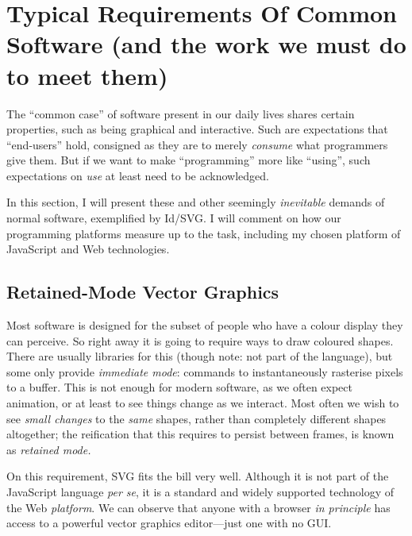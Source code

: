 \hypertarget{typical-requirements-of-common-software-and-the-work-we-must-do-to-meet-them}{%
\section{Typical Requirements Of Common Software (and the work we must
do to meet
them)}\label{typical-requirements-of-common-software-and-the-work-we-must-do-to-meet-them}}

The ``common case'' of software present in our daily lives shares
certain properties, such as being graphical and interactive. Such are
expectations that ``end-users'' hold, consigned as they are to merely
\emph{consume} what programmers give them. But if we want to make
``programming'' more like ``using'', such expectations on \emph{use} at
least need to be acknowledged.

In this section, I will present these and other seemingly
\emph{inevitable} demands of normal software, exemplified by Id{}/SVG. I
will comment on how our programming platforms measure up to the task,
including my chosen platform of JavaScript and Web technologies.

\hypertarget{retained-mode-vector-graphics}{%
\subsection{Retained-Mode Vector
Graphics}\label{retained-mode-vector-graphics}}

Most software is designed for the subset of people who have a colour
display they can perceive. So right away it is going to require ways to
draw coloured shapes. There are usually libraries for this (though note:
not part of the language), but some only provide \emph{immediate mode}:
commands to instantaneously rasterise pixels to a buffer. This is not
enough for modern software, as we often expect animation, or at least to
see things change as we interact. Most often we wish to see \emph{small
changes} to the \emph{same} shapes, rather than completely different
shapes altogether; the reification that this requires to persist between
frames, is known as \emph{retained mode.}

On this requirement, SVG fits the bill very well. Although it is not
part of the JavaScript language \emph{per se}, it is a standard and
widely supported technology of the Web \emph{platform}. We can observe
that anyone with a browser \emph{in principle} has access to a powerful
vector graphics editor---just one with no GUI.

